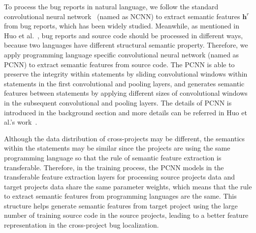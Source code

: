 To process the bug reports in natural language, we follow the standard convolutional neural network~\cite{kim2014convolutional} (named as NCNN) to extract semantic features $\mathbf{h}^r$ from bug reports, which has been widely studied. Meanwhile, as mentioned in Huo et al.~\cite{huo2016learning}, bug reports and source code should be processed in different ways, because two languages have different structural semantic property. Therefore, we apply programming language specific convolutional neural network (named as PCNN) to extract semantic features from source code. The PCNN is able to preserve the integrity within statements by sliding convolutional windows within statements in the first convolutional and pooling layers, and generates semantic features between statements by applying  different sizes of convolutional windows in the subsequent convolutional and pooling layers. The details of PCNN is introduced in the background section and more details can be referred in Huo et al.'s work~\cite{huo2016learning}.


Although the data distribution of cross-projects may be different, the semantics within the statements may be similar since the projects are using the same programming language so that the rule of semantic feature extraction is transferable. Therefore, in the training process, the PCNN models in the transferable feature extraction layers for processing source projects data and target projects data share the same parameter weights, which means that the rule to extract semantic features from programming languages are the same. This structure helps generate semantic features from target project using the large number of training source code in the source projects, leading to a better feature representation in the cross-project bug localization. 
 
